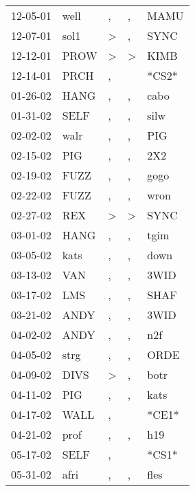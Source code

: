 \begin{supertabular}{lllll}
 12-05-01 &   well &                , &                , &   MAMU \\
 12-07-01 &   sol1 &     \textgreater &                , &   SYNC \\
 12-12-01 &   PROW &     \textgreater &     \textgreater &   KIMB \\
 12-14-01 &   PRCH &                , &                  &  *CS2* \\
 01-26-02 &   HANG &                , &                , &   cabo \\
 01-31-02 &   SELF &                , &                , &   silw \\
 02-02-02 &   walr &                , &                , &    PIG \\
 02-15-02 &    PIG &                , &                , &    2X2 \\
 02-19-02 &   FUZZ &                , &                , &   gogo \\
 02-22-02 &   FUZZ &                , &                , &   wron \\
 02-27-02 &    REX &     \textgreater &     \textgreater &   SYNC \\
 03-01-02 &   HANG &                , &                , &   tgim \\
 03-05-02 &   kats &                , &                , &   down \\
 03-13-02 &    VAN &                , &                , &   3WID \\
 03-17-02 &    LMS &                , &                , &   SHAF \\
 03-21-02 &   ANDY &                , &                , &   3WID \\
 04-02-02 &   ANDY &                , &                , &    n2f \\
 04-05-02 &   strg &                , &                , &   ORDE \\
 04-09-02 &   DIVS &     \textgreater &                , &   botr \\
 04-11-02 &    PIG &                , &                , &   kats \\
 04-17-02 &   WALL &                , &                  &  *CE1* \\
 04-21-02 &   prof &                , &                , &    h19 \\
 05-17-02 &   SELF &                , &                  &  *CS1* \\
 05-31-02 &   afri &                , &                , &   fles \\

\end{supertabular}
